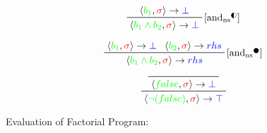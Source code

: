 \documentclass{article}
\begin{document}
\begin{displaymath}
  \prftree[r]{\text{[and\textsubscript{ns}\textsuperscript{\LEFTcircle}]}}
      {\rulen{b_1}{\sigma}{\bot}}
      {\rulen{b_1 \land b_2}{\sigma}{\bot}}
\end{displaymath}

\begin{displaymath}
  \prftree[r]{\text{[and\textsubscript{ns}\textsuperscript{\CIRCLE}]}}
      {\rulen{b_1}{\sigma}{\bot}}
      {\rulen{b_2}{\sigma}{rhs}}
      {\rulen{b_1 \land b_2}{\sigma}{rhs}}
\end{displaymath}

\begin{displaymath}
\prftree{\prftree{}{\rulen{false}{\sigma}{\bot}}}{\rulen{\neg (false)}{\sigma}{\top}}
\end{displaymath}


\eject \pdfpagewidth=40in \pdfpageheight=9in
Evaluation of Factorial Program:
\end{document}
